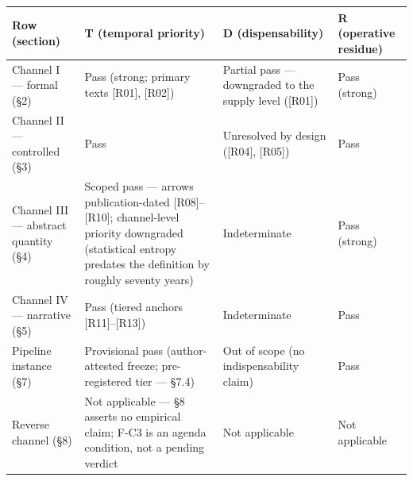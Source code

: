 \documentclass[11pt,a4paper]{article}
\begin{document}
\begin{table}[htbp]
\centering
\footnotesize
\setlength{\tabcolsep}{3.5pt}
\renewcommand{\arraystretch}{1.18}
\begin{tabularx}{0.985\textwidth}{@{}>{\raggedright\arraybackslash}p{}>{\raggedright\arraybackslash}X>{\raggedright\arraybackslash}X>{\raggedright\arraybackslash}X@{}}
\toprule
\textbf{Row (section)} & \textbf{T (temporal priority)} & \textbf{D (dispensability)} & \textbf{R (operative residue)} \\
\midrule
Channel I — formal (§2) & Pass (strong; primary texts [R01], [R02]) & Partial pass — downgraded to the supply level ([R01]) & Pass (strong) \\
Channel II — controlled (§3) & Pass & Unresolved by design ([R04], [R05]) & Pass \\
Channel III — abstract quantity (§4) & Scoped pass — arrows publication-dated [R08]–[R10]; channel-level priority downgraded (statistical entropy predates the definition by roughly seventy years) & Indeterminate & Pass (strong) \\
Channel IV — narrative (§5) & Pass (tiered anchors [R11]–[R13]) & Indeterminate & Pass \\
Pipeline instance (§7) & Provisional pass (author-attested freeze; pre-registered tier — §7.4) & Out of scope (no indispensability claim) & Pass \\
Reverse channel (§8) & Not applicable — §8 asserts no empirical claim; F-C3 is an agenda condition, not a pending verdict & Not applicable & Not applicable \\
\bottomrule
\end{tabularx}
\end{table}
\end{document}
